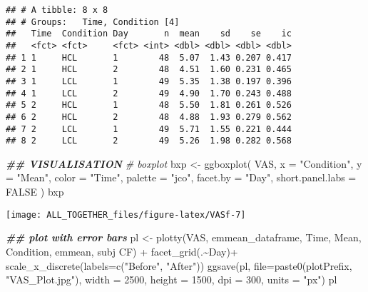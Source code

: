 \documentclass[
]{article}
\newenvironment{Shaded}{\begin{snugshade}}{\end{snugshade}}
\newcommand{\AttributeTok}[1]{\textcolor[rgb]{0.77,0.63,0.00}{#1}}
\newcommand{\CommentTok}[1]{\textcolor[rgb]{0.56,0.35,0.01}{\textit{#1}}}
\newcommand{\ConstantTok}[1]{\textcolor[rgb]{0.00,0.00,0.00}{#1}}
\newcommand{\DecValTok}[1]{\textcolor[rgb]{0.00,0.00,0.81}{#1}}
\newcommand{\DocumentationTok}[1]{\textcolor[rgb]{0.56,0.35,0.01}{\textbf{\textit{#1}}}}
\newcommand{\FunctionTok}[1]{\textcolor[rgb]{0.00,0.00,0.00}{#1}}
\newcommand{\NormalTok}[1]{#1}
\newcommand{\OtherTok}[1]{\textcolor[rgb]{0.56,0.35,0.01}{#1}}
\newcommand{\SpecialCharTok}[1]{\textcolor[rgb]{0.00,0.00,0.00}{#1}}
\newcommand{\StringTok}[1]{\textcolor[rgb]{0.31,0.60,0.02}{#1}}
\begin{document}
\begin{verbatim}
## # A tibble: 8 x 8
## # Groups:   Time, Condition [4]
##   Time  Condition Day       n  mean    sd    se    ic
##   <fct> <fct>     <fct> <int> <dbl> <dbl> <dbl> <dbl>
## 1 1     HCL       1        48  5.07  1.43 0.207 0.417
## 2 1     HCL       2        48  4.51  1.60 0.231 0.465
## 3 1     LCL       1        49  5.35  1.38 0.197 0.396
## 4 1     LCL       2        49  4.90  1.70 0.243 0.488
## 5 2     HCL       1        48  5.50  1.81 0.261 0.526
## 6 2     HCL       2        48  4.88  1.93 0.279 0.562
## 7 2     LCL       1        49  5.71  1.55 0.221 0.444
## 8 2     LCL       2        49  5.26  1.98 0.282 0.568
\end{verbatim}

\begin{Shaded}
\begin{Highlighting}[]
\DocumentationTok{\#\# VISUALISATION}
\CommentTok{\# boxplot }
\NormalTok{bxp }\OtherTok{\textless{}{-}} \FunctionTok{ggboxplot}\NormalTok{(}
\NormalTok{  VAS, }\AttributeTok{x =} \StringTok{"Condition"}\NormalTok{, }\AttributeTok{y =} \StringTok{"Mean"}\NormalTok{,}
  \AttributeTok{color =} \StringTok{"Time"}\NormalTok{, }\AttributeTok{palette =} \StringTok{"jco"}\NormalTok{,}
  \AttributeTok{facet.by =} \StringTok{"Day"}\NormalTok{, }\AttributeTok{short.panel.labs =} \ConstantTok{FALSE}
\NormalTok{  )}
\NormalTok{bxp}
\end{Highlighting}
\end{Shaded}

\texttt{[image: ALL\_TOGETHER\_files/figure-latex/VASf-7]}

\begin{Shaded}
\begin{Highlighting}[]
\DocumentationTok{\#\# plot with error bars}
\NormalTok{pl }\OtherTok{\textless{}{-}} \FunctionTok{plotty}\NormalTok{(VAS, emmean\_dataframe, }\StringTok{\textquotesingle{}Time\textquotesingle{}}\NormalTok{, }\StringTok{\textquotesingle{}Mean\textquotesingle{}}\NormalTok{, }\StringTok{\textquotesingle{}Condition\textquotesingle{}}\NormalTok{, }\StringTok{\textquotesingle{}emmean\textquotesingle{}}\NormalTok{, }\StringTok{\textquotesingle{}subj CF\textquotesingle{}}\NormalTok{) }\SpecialCharTok{+}
 \FunctionTok{facet\_grid}\NormalTok{(.}\SpecialCharTok{\textasciitilde{}}\NormalTok{Day)}\SpecialCharTok{+}
\FunctionTok{scale\_x\_discrete}\NormalTok{(}\AttributeTok{labels=}\FunctionTok{c}\NormalTok{(}\StringTok{"Before"}\NormalTok{, }\StringTok{"After"}\NormalTok{))}
\FunctionTok{ggsave}\NormalTok{(pl, }\AttributeTok{file=}\FunctionTok{paste0}\NormalTok{(plotPrefix, }\StringTok{"VAS\_Plot.jpg"}\NormalTok{), }\AttributeTok{width =} \DecValTok{2500}\NormalTok{, }\AttributeTok{height =} \DecValTok{1500}\NormalTok{, }\AttributeTok{dpi =} \DecValTok{300}\NormalTok{, }\AttributeTok{units =} \StringTok{"px"}\NormalTok{)}
\NormalTok{pl}
\end{Highlighting}
\end{Shaded}
\end{document}
